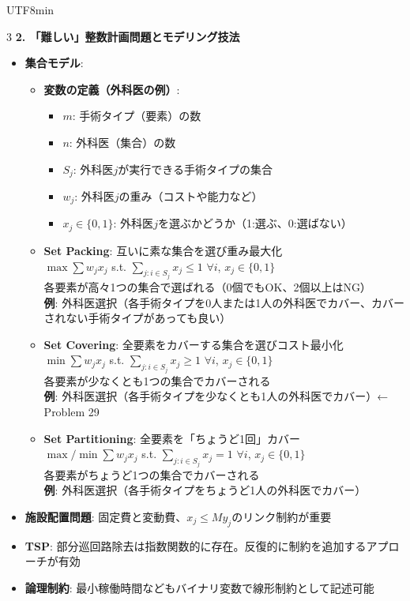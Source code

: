 \documentclass[8pt,a4paper]{article}
\begin{document}
\begin{CJK}{UTF8}{min}
\begin{multicols}{3}
\textbf{2. 「難しい」整数計画問題とモデリング技法}
\begin{itemize}
    \item \textbf{集合モデル}:
    \begin{itemize}
        \item \textbf{変数の定義（外科医の例）}:
        \begin{itemize}
            \item $m$: 手術タイプ（要素）の数
            \item $n$: 外科医（集合）の数
            \item $S_j$: 外科医$j$が実行できる手術タイプの集合
            \item $w_j$: 外科医$j$の重み（コストや能力など）
            \item $x_j \in \{0,1\}$: 外科医$j$を選ぶかどうか（1:選ぶ、0:選ばない）
        \end{itemize}
        
        \item \textbf{Set Packing}: 互いに素な集合を選び重み最大化\\
        $\max \sum w_j x_j$ s.t. $\sum_{j: i \in S_j} x_j \leq 1$ $\forall i$, $x_j \in \{0,1\}$\\
        各要素が高々1つの集合で選ばれる（0個でもOK、2個以上はNG）\\
        \textbf{例}: 外科医選択（各手術タイプを0人または1人の外科医でカバー、カバーされない手術タイプがあっても良い）
        
        \item \textbf{Set Covering}: 全要素をカバーする集合を選びコスト最小化\\
        $\min \sum w_j x_j$ s.t. $\sum_{j: i \in S_j} x_j \geq 1$ $\forall i$, $x_j \in \{0,1\}$\\
        各要素が少なくとも1つの集合でカバーされる\\
        \textbf{例}: 外科医選択（各手術タイプを少なくとも1人の外科医でカバー）← Problem 29
        
        \item \textbf{Set Partitioning}: 全要素を「ちょうど1回」カバー\\
        $\max/\min \sum w_j x_j$ s.t. $\sum_{j: i \in S_j} x_j = 1$ $\forall i$, $x_j \in \{0,1\}$\\
        各要素がちょうど1つの集合でカバーされる\\
        \textbf{例}: 外科医選択（各手術タイプをちょうど1人の外科医でカバー）
    \end{itemize}
    \item \textbf{施設配置問題}: 固定費と変動費、$x_j \leq M y_j$のリンク制約が重要
    \item \textbf{TSP}: 部分巡回路除去は指数関数的に存在。反復的に制約を追加するアプローチが有効
    \item \textbf{論理制約}: 最小稼働時間などもバイナリ変数で線形制約として記述可能
\end{itemize}


\end{multicols}
\end{CJK}
\end{document}
